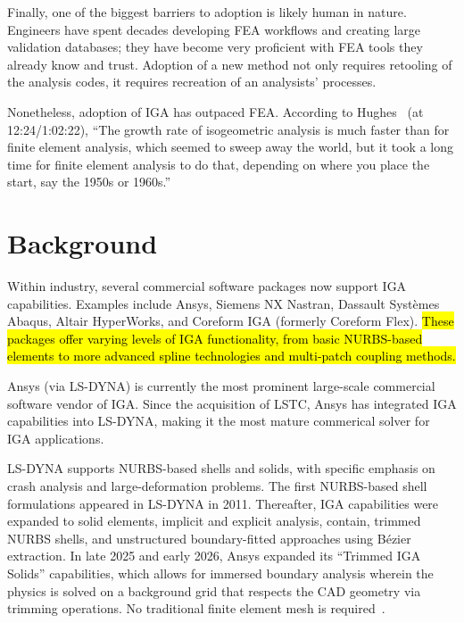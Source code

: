 \documentclass[12pt,report,justified]{SANDreport}
\begin{document}
Finally, one of the biggest barriers to adoption is likely human in nature.  
Engineers have spent decades developing FEA workflows and creating large validation
databases; they have become very proficient with FEA tools they already know and trust. 
Adoption of a new method not only requires retooling of the analysis codes,
it requires recreation of an analysists' processes.

Nonetheless, adoption of IGA has outpaced FEA.  According to Hughes~\cite{Hughes2022NCSU} (at 12:24/1:02:22), ``The growth rate of isogeometric analysis is much faster than for finite element analysis, which seemed to sweep away the world, but it took a long time for finite element analysis to do that, depending on where you place the start, say the 1950s or 1960s.''





%
%

\chapter{Background}

Within industry, several commercial software packages now support IGA capabilities.  Examples include Ansys, Siemens NX Nastran, Dassault Systèmes Abaqus, Altair HyperWorks, and Coreform IGA (formerly Coreform Flex).  \hl{These packages offer varying levels of IGA functionality, from basic NURBS-based elements to more advanced spline technologies and multi-patch coupling methods.}

Ansys (via LS-DYNA) is currently the most prominent large-scale commercial software vendor of IGA.  Since the acquisition of LSTC, Ansys has integrated IGA capabilities into LS-DYNA, making it the most mature commerical solver for IGA applications.

LS-DYNA supports NURBS-based shells and solids, with specific emphasis on crash analysis and large-deformation problems.  The first NURBS-based shell formulations appeared in LS-DYNA in 2011.  Thereafter, IGA capabilities were expanded to solid elements, implicit and explicit analysis, contain, trimmed NURBS shells, and unstructured boundary-fitted approaches using B\'ezier extraction. In late 2025 and early 2026, Ansys expanded its ``Trimmed IGA Solids'' capabilities, which allows for immersed boundary analysis wherein the physics is solved on a background grid that respects the CAD geometry via trimming operations.  No traditional finite element mesh is required~\cite{Novozhilov2025}.
\end{document}
